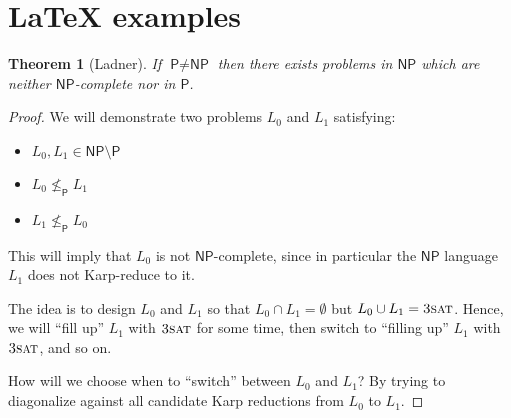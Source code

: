 \documentclass[letterpaper,11pt]{article}
\newtheorem{theorem}{Theorem}
\newcommand{\cc}[1]{\ensuremath{\textsf{#1}}\xspace}
\renewcommand{\P}{\cc{P}}
\newcommand{\NP}{\cc{NP}}
\newcommand{\karp}{\le_{\textsf{P}}}
\newcommand{\problem}[1]{\ensuremath{\textsc{#1}}\xspace}
\newcommand{\ThreeSAT}{\problem{3sat}}
\begin{document}
\section*{LaTeX examples}

\begin{theorem}[Ladner]
    If $\P \ne \NP$ then there exists problems in $\NP$ which are neither \NP-complete nor in \P.
\end{theorem}
\begin{proof}
    We will demonstrate two problems $L_0$ and $L_1$ satisfying:
    \begin{itemize}
        \item $L_0, L_1 \in \NP \setminus \P$
        \item $L_0 \not\karp L_1$
        \item $L_1 \not\karp L_0$
    \end{itemize}
    This will imply that $L_0$ is not \NP-complete, since in particular the \NP language $L_1$ does not Karp-reduce to it.

The idea is to design $L_0$ and $L_1$ so that $L_0 \cap L_1 = \emptyset$ but $L_0 \cup L_1 = \ThreeSAT$. Hence, we will ``fill up'' $L_1$ with \ThreeSAT for some time, then switch to ``filling up'' $L_1$ with \ThreeSAT, and so on. 

How will we choose when to ``switch'' between $L_0$ and $L_1$? By trying to diagonalize against all candidate Karp reductions from $L_0$ to $L_1$. 


\end{proof}
\end{document}
